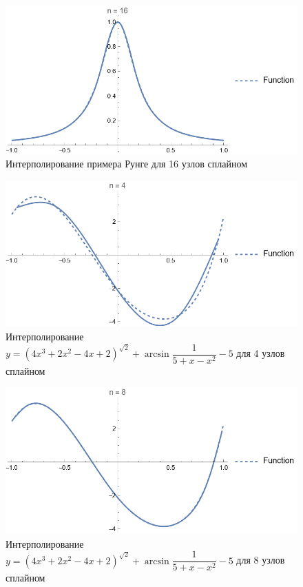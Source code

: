 \documentclass{article}
\begin{document}
    \begin{figure}[H]
        \includegraphics[width=\textwidth]{splinerunge16.png}
        \caption{{Интерполирование примера Рунге для 16 узлов сплайном}}
    \end{figure}
    \begin{figure}[H]
        \includegraphics[width=\textwidth]{splinetest4.png}
        \caption{{Интерполирование $y = (4x^3 + 2x^2 - 4x + 2 )^{\sqrt{2}} + \arcsin{\dfrac{1}{5+x - x^2}} - 5$ для 4 узлов сплайном}}
    \end{figure}
    \begin{figure}[H]
        \includegraphics[width=\textwidth]{splinetest8.png}
        \caption{{Интерполирование $y = (4x^3 + 2x^2 - 4x + 2 )^{\sqrt{2}} + \arcsin{\dfrac{1}{5+x - x^2}} - 5$ для 8 узлов сплайном}}
    \end{figure}
\end{document}
